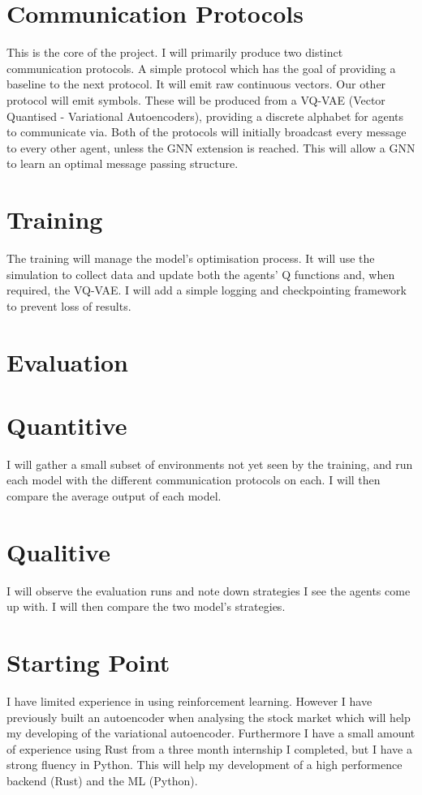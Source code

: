 \documentclass[20pt]{article}
\begin{document}
\section*{Communication Protocols}
This is the core of the project. I will primarily produce two distinct communication protocols. A simple protocol which has the goal of providing a baseline to the next protocol. It will emit raw continuous vectors. Our other protocol will emit symbols. These will be produced from a VQ-VAE (Vector Quantised - Variational Autoencoders), providing a discrete alphabet for agents to communicate via. Both of the protocols will initially broadcast every message to every other agent, unless the GNN extension is reached. This will allow a GNN to learn  an optimal message passing structure.

\section*{Training}
The training will manage the model's optimisation process. It will use the simulation to collect data and update both the agents' Q functions and, when required, the VQ-VAE. I will add a simple logging and checkpointing framework to prevent loss of results.

\section{Evaluation}

\section*{Quantitive}
I will gather a small subset of environments not yet seen by the training, and run each model with the different communication protocols on each. I will then compare the average output of each model.

\section*{Qualitive}
I will observe the evaluation runs and note down strategies I see the agents come up with. I will then compare the two model's strategies.


\section{Starting Point}
I have limited experience in using reinforcement learning. However I have previously built an autoencoder when analysing the stock market which will help my developing of the variational autoencoder. Furthermore I have a small amount of experience using Rust from a three month internship I completed, but I have a strong fluency in Python. This will help my development of a high performence backend (Rust) and the ML (Python).
\end{document}

